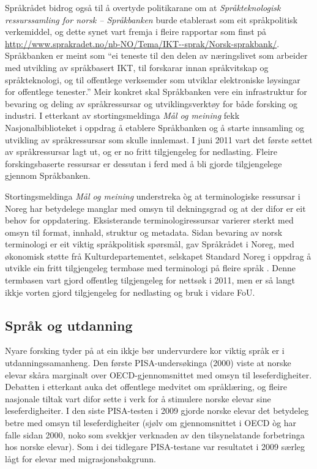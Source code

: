 \begin{multicols}{2}
Språkrådet bidrog også til å overtyde politikarane om at \textit{Språkteknologisk ressurssamling for norsk – Språkbanken} burde etablerast som eit språkpolitisk verkemiddel, og dette synet vart fremja i fleire rapportar som finst på \url{http://www.sprakradet.no/nb-NO/Tema/IKT--sprak/Norsk-sprakbank/}.
Språkbanken er meint som ``ei teneste til den delen av næringslivet som arbeider med utvikling av språkbasert IKT, til forskarar innan språkvitskap og språkteknologi, og til offentlege verksemder som utviklar elektroniske løysingar for offentlege tenester.'' %
Meir konkret skal Språkbanken vere ein infrastruktur for bevaring og deling av språkressursar og utviklingsverktøy for både forsking og industri. 
I etterkant av stortingsmeldinga \textit{Mål og meining} \cite{stm35:2008} fekk Nasjonalbiblioteket i oppdrag å etablere Språkbanken og å starte innsamling og utvikling av språkressursar som skulle innlemast. 
I juni 2011 vart det første settet av språkressursar lagt ut, og er no fritt tilgjengeleg for nedlasting. 
Fleire forskingsbaserte ressursar er dessutan i ferd med å bli gjorde tilgjengelege gjennom Språkbanken. 

Stortingsmeldinga \textit{Mål og meining} understreka òg at terminologiske ressursar i Noreg har betydelege manglar med omsyn til dekningsgrad og at der difor er eit behov for oppdatering. Eksisterande terminologiressursar varierer sterkt med omsyn til format, innhald, struktur og metadata. 
Sidan bevaring av norsk terminologi er eit viktig språkpolitisk spørsmål, gav Språkrådet i Noreg, med økonomisk støtte frå Kulturdepartementet, selskapet Standard Noreg i oppdrag å utvikle ein fritt tilgjengeleg termbase med terminologi på fleire språk \cite{drosdal2010}. 
Denne termbasen vart gjord offentleg tilgjengeleg for nettsøk i 2011, men er så langt ikkje vorten gjord tilgjengeleg for nedlasting og bruk i vidare FoU. 
 
\subsection{Språk og utdanning}

Nyare forsking tyder på at ein ikkje bør undervurdere kor viktig språk er i utdanningssamanheng. 
Den første PISA-undersøkinga (2000) viste at norske elevar skåra marginalt over OECD-gjennomsnittet med omsyn til leseferdigheiter. 
Debatten i etterkant auka det offentlege medvitet om språklæring, og fleire nasjonale tiltak vart difor sette i verk for å stimulere norske elevar sine leseferdigheiter. 
I den siste PISA-testen i 2009  \cite{pisa2009eng} gjorde norske elevar det betydeleg betre med omsyn til leseferdigheiter (sjølv om gjennomsnittet i OECD òg har falle sidan 2000, noko som svekkjer verknaden av den tilsynelatande forbetringa hos norske elevar). 
Som i dei tidlegare PISA-testane var resultatet i 2009 særleg lågt for elevar med migrasjonsbakgrunn. 


\end{multicols}
